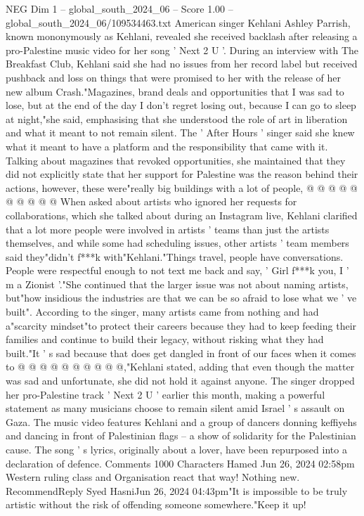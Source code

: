 \begin{textsample}{NEG Dim 1 – global\_south\_2024\_06 – Score 1.00 – global\_south\_2024\_06/109534463.txt}  \label{ex:f1_neg_407}
American singer Kehlani Ashley Parrish, known mononymously as Kehlani, revealed she received backlash after releasing a pro-Palestine music video for her song ' Next 2 U '.
During an interview with The Breakfast Club, Kehlani said she had no issues from her record label but received pushback and loss on things that were promised to her with the release of her new album Crash."Magazines, brand deals and opportunities that I was sad to lose, but at the end of the day I don't regret losing out, because I can go to sleep at night,"she said, emphasising that she understood the role of art in liberation and what it meant to not remain silent.
The ' After Hours ' singer said she knew what it meant to have a platform and the responsibility that came with it.
Talking about magazines that revoked opportunities, she maintained that they did not explicitly state that her support for Palestine was the reason behind their actions, however, these were"really big buildings with a lot of people, @ @ @ @ @ @ @ @ @ @ When asked about artists who ignored her requests for collaborations, which she talked about during an Instagram live, Kehlani clarified that a lot more people were involved in artists ' teams than just the artists themselves, and while some had scheduling issues, other artists ' team members said they"didn't f***k with"Kehlani."Things travel, people have conversations.
People were respectful enough to not text me back and say, ' Girl f***k you, I ' m a Zionist '."She continued that the larger issue was not about naming artists, but"how insidious the industries are that we can be so afraid to lose what we ' ve built".
According to the singer, many artists came from nothing and had a"scarcity mindset"to protect their careers because they had to keep feeding their families and continue to build their legacy, without risking what they had built."It ' s sad because that does get dangled in front of our faces when it comes to @ @ @ @ @ @ @ @ @ @,"Kehlani stated, adding that even though the matter was sad and unfortunate, she did not hold it against anyone.
The singer dropped her pro-Palestine track ' Next 2 U ' earlier this month, making a powerful statement as many musicians choose to remain silent amid Israel ' s assault on Gaza.
The music video features Kehlani and a group of dancers donning keffiyehs and dancing in front of Palestinian flags -- a show of solidarity for the Palestinian cause.
The song ' s lyrics, originally about a lover, have been repurposed into a declaration of defence.
Comments 1000 Characters Hamed Jun 26, 2024 02:58pm Western ruling class and Organisation react that way!
Nothing new.
RecommendReply Syed HasniJun 26, 2024 04:43pm"It is impossible to be truly artistic without the risk of offending someone somewhere."Keep it up!

\end{textsample}
